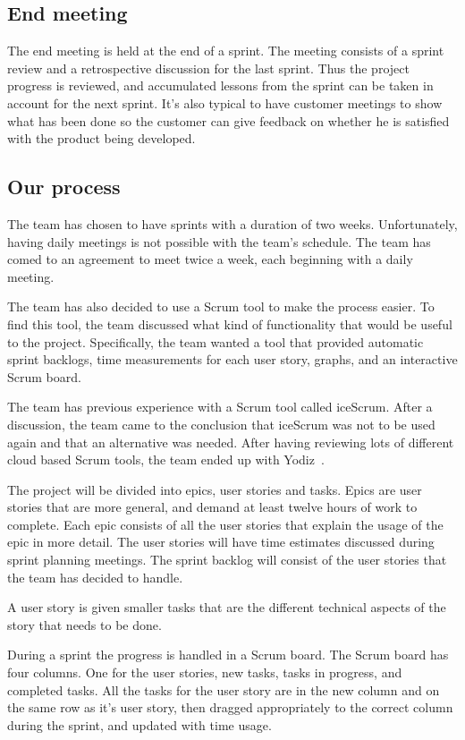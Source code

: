 \subsection{End meeting}
The end meeting is held at the end of a sprint. The meeting consists of a sprint review and a retrospective discussion 
for the last sprint.
Thus the project progress is reviewed, and accumulated lessons from the sprint can be taken in account for the
next sprint.
It's also typical to have customer meetings to show what has been done so the customer can give feedback on 
whether he is satisfied with the product being developed.

\subsection{Our process}
The team has chosen to have sprints with a duration of two weeks. Unfortunately, having daily meetings is not 
possible with the team's schedule.
The team has comed to an agreement to meet twice a week, each beginning with a daily meeting.

The team has also decided to use a Scrum tool to make the process easier.
To find this tool, the team discussed what kind of functionality that would be useful to the project. 
Specifically, the team wanted a tool that provided automatic sprint backlogs, time measurements for each user story, 
graphs, and an interactive Scrum board.

The team has previous experience with a Scrum tool called iceScrum. After a discussion, the team came to the conclusion 
that iceScrum was not to be used again and that an alternative was needed.
After having reviewing lots of different cloud based Scrum tools, the team ended up with Yodiz~\cite{yodiz}.

The project will be divided into epics, user stories and tasks. Epics are user stories that are more general, 
and demand at least twelve hours of work to complete. Each epic consists
of all the user stories that explain the usage of the epic in more detail.
The user stories will have time estimates discussed during sprint planning meetings.
The sprint backlog will consist of the user stories that the team has decided to handle.

A user story is given smaller tasks that are the different technical aspects of the story that needs to be done.

During a sprint the progress is handled in a Scrum board. The Scrum board has four columns. One for the user stories, new tasks, tasks in progress, and completed tasks.
All the tasks for the user story are in the new column and on the same row as it's user story, then dragged appropriately to the correct column during the sprint, and updated with time usage.
